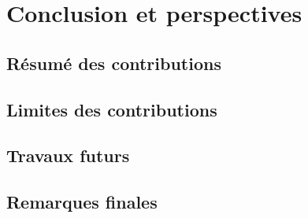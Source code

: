 \chapter{Conclusion et perspectives}

\section{Résumé des contributions}

\section{Limites des contributions}

\section{Travaux futurs}



\section{Remarques finales}
